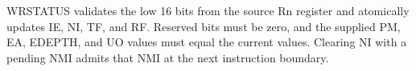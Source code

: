 WRSTATUS validates the low 16 bits from the source Rn register and atomically updates IE, NI, TF, and RF. Reserved bits must be zero, and the supplied PM, EA, EDEPTH, and UO values must equal the current values. Clearing NI with a pending NMI admits that NMI at the next instruction boundary.
